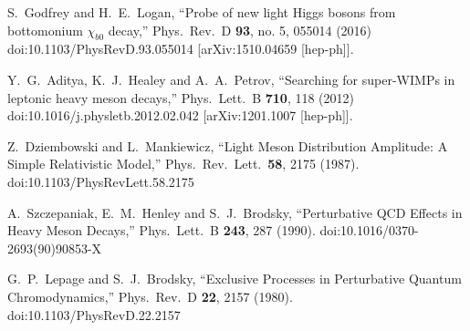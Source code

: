 \documentclass[12pt]{article}
\begin{document}
\begin{thebibliography}{99}
  S.~Godfrey and H.~E.~Logan,
  ``Probe of new light Higgs bosons from bottomonium $\chi_{b0}$ decay,''
  Phys.\ Rev.\ D {\bf 93}, no. 5, 055014 (2016)
  doi:10.1103/PhysRevD.93.055014
  [arXiv:1510.04659 [hep-ph]].

  Y.~G.~Aditya, K.~J.~Healey and A.~A.~Petrov,
  ``Searching for super-WIMPs in leptonic heavy meson decays,''
  Phys.\ Lett.\ B {\bf 710}, 118 (2012)
  doi:10.1016/j.physletb.2012.02.042
  [arXiv:1201.1007 [hep-ph]].

  Z.~Dziembowski and L.~Mankiewicz,
  ``Light Meson Distribution Amplitude: A Simple Relativistic Model,''
  Phys.\ Rev.\ Lett.\  {\bf 58}, 2175 (1987).
  doi:10.1103/PhysRevLett.58.2175
  
  A.~Szczepaniak, E.~M.~Henley and S.~J.~Brodsky,
  ``Perturbative {QCD} Effects in Heavy Meson Decays,''
  Phys.\ Lett.\ B {\bf 243}, 287 (1990).
  doi:10.1016/0370-2693(90)90853-X
  
  G.~P.~Lepage and S.~J.~Brodsky,
  ``Exclusive Processes in Perturbative Quantum Chromodynamics,''
  Phys.\ Rev.\ D {\bf 22}, 2157 (1980).
  doi:10.1103/PhysRevD.22.2157
  
\end{thebibliography}
 
\end{document}

